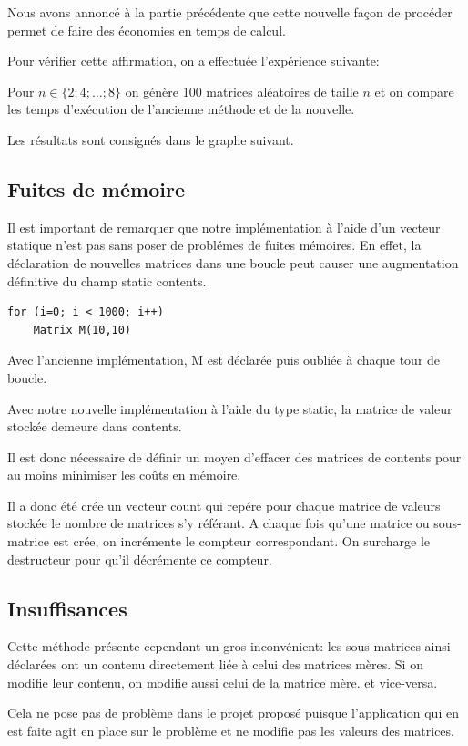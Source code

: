 \documentclass[a4paper,11pt]{article}
\begin{document}
Nous avons annoncé à la partie précédente que cette nouvelle façon de procéder permet de faire des économies en temps de calcul.

Pour vérifier cette affirmation, on a effectuée l'expérience suivante:

Pour $n \in \{2;4;\dots;8\}$ on génère 100 matrices aléatoires de taille $n$ et on compare les temps d'exécution de l'ancienne méthode et de la nouvelle.

Les résultats sont consignés dans le graphe suivant.

\subsection{Fuites de mémoire}

Il est important de remarquer que notre implémentation à l'aide d'un vecteur statique n'est pas sans poser de problémes de fuites mémoires.
En effet, la déclaration de nouvelles matrices dans une boucle peut causer une augmentation définitive du champ static contents.

\begin{lstlisting}
for (i=0; i < 1000; i++)
    Matrix M(10,10)
\end{lstlisting}

Avec l'ancienne implémentation, M est déclarée puis oubliée à chaque tour de boucle.

Avec notre nouvelle implémentation à l'aide du type static, la matrice de valeur stockée demeure dans contents.

Il est donc nécessaire de définir un moyen d'effacer des matrices de contents pour au moins minimiser les coûts en mémoire.

Il a donc été crée un vecteur count qui repére pour chaque matrice de valeurs stockée le nombre de matrices s'y référant. A chaque fois qu'une matrice ou sous-matrice est crée, on incrémente le compteur correspondant. On surcharge le destructeur pour qu'il décrémente ce compteur.

\subsection{Insuffisances}

Cette méthode présente cependant un gros inconvénient: les sous-matrices ainsi déclarées ont un contenu directement liée à celui des matrices mères. Si on modifie leur contenu, on modifie aussi celui de la matrice mère. et vice-versa.

Cela ne pose pas de problème dans le projet proposé puisque l'application qui en est faite agit en place sur le problème et ne modifie pas les valeurs des matrices.
\end{document}

